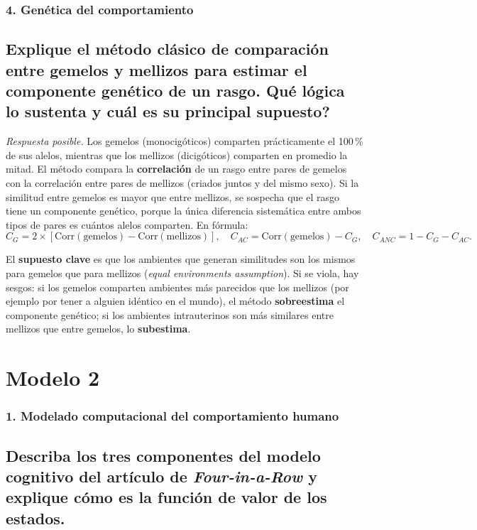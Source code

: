 \documentclass[11pt, a4paper]{article}
\newcommand{\pregunta}[1]{\subsection{#1}}
\newcommand{\eje}[1]{\subsubsection{#1}}
\begin{document}
\eje{4. Gen\'etica del comportamiento}
\pregunta{Explique el m\'etodo cl\'asico de comparaci\'on entre gemelos y mellizos para estimar el componente gen\'etico de un rasgo. \textquestiondown Qu\'e l\'ogica lo sustenta y cu\'al es su principal supuesto?}

\begin{respuesta}
\textit{Respuesta posible.} Los gemelos (monocig\'oticos) comparten pr\'acticamente el 100\,\% de sus alelos, mientras que los mellizos (dicig\'oticos) comparten en promedio la mitad. El m\'etodo compara la \textbf{correlaci\'on} de un rasgo entre pares de gemelos con la correlaci\'on entre pares de mellizos (criados juntos y del mismo sexo). Si la similitud entre gemelos es mayor que entre mellizos, se sospecha que el rasgo tiene un componente gen\'etico, porque la \'unica diferencia sistem\'atica entre ambos tipos de pares es cu\'antos alelos comparten. En f\'ormula:
\[
C_G = 2 \times [\mathrm{Corr}(\text{gemelos}) - \mathrm{Corr}(\text{mellizos})], \quad
C_{AC} = \mathrm{Corr}(\text{gemelos}) - C_G, \quad
C_{ANC} = 1 - C_G - C_{AC}.
\]

El \textbf{supuesto clave} es que los ambientes que generan similitudes son los mismos para gemelos que para mellizos (\emph{equal environments assumption}). Si se viola, hay sesgos: si los gemelos comparten ambientes m\'as parecidos que los mellizos (por ejemplo por tener a alguien id\'entico en el mundo), el m\'etodo \textbf{sobreestima} el componente gen\'etico; si los ambientes intrauterinos son m\'as similares entre mellizos que entre gemelos, lo \textbf{subestima}.
\end{respuesta}

\section{Modelo 2}

\eje{1. Modelado computacional del comportamiento humano}
\pregunta{Describa los tres componentes del modelo cognitivo del art\'iculo de \textit{Four-in-a-Row} y explique c\'omo es la funci\'on de valor de los estados.}
\end{document}

